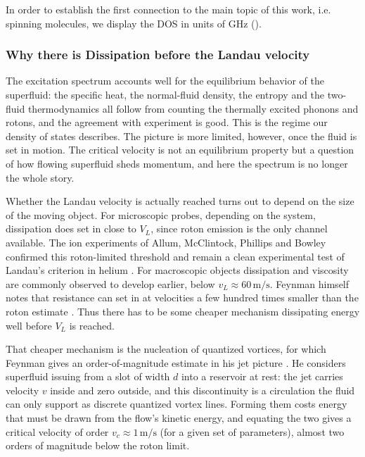 In order to establish the first connection to the main topic of this work, i.e. spinning molecules, we display the DOS in units of GHz ().

\subsubsection{Why there is Dissipation before the Landau velocity}
The excitation spectrum accounts well for the equilibrium behavior of the superfluid: the specific heat, the normal-fluid density, the entropy and the two-fluid thermodynamics all follow from counting the thermally excited phonons and rotons, and the agreement with experiment is good. This is the regime our density of states describes. The picture is more limited, however, once the fluid is set in motion. The critical velocity is not an equilibrium property but a question of how flowing superfluid sheds momentum, and here the spectrum is no longer the whole story.

Whether the Landau velocity is actually reached turns out to depend on the size of the moving object. For microscopic probes, depending on the system, dissipation does set in close to $V_L$, since roton emission is the only channel available. The ion experiments of Allum, McClintock, Phillips and Bowley confirmed this roton-limited threshold and remain a clean experimental test of Landau's criterion in helium \cite{allumBreakdownSuperfluidityLiquid1977}. For macroscopic objects dissipation and viscosity are commonly observed to develop earlier, below $v_L \approx 60\,\mathrm{m/s}$.\cite{mullerCriticalVelocityVortex2022} Feynman himself notes that resistance can set in at velocities a few hundred times smaller than the roton estimate \cite{feynmanChapterIIApplication1955}. Thus there has to be some cheaper mechanism dissipating energy well before $V_L$ is reached.

That cheaper mechanism is the nucleation of quantized vortices, for which Feynman gives an order-of-magnitude estimate in his jet picture \cite{feynmanChapterIIApplication1955}. He considers superfluid issuing from a slot of width $d$ into a reservoir at rest: the jet carries velocity $v$ inside and zero outside, and this discontinuity is a circulation the fluid can only support as discrete quantized vortex lines. Forming them costs energy that must be drawn from the flow's kinetic energy, and equating the two gives a critical velocity of order $v_c \approx 1\,\mathrm{m/s}$  (for a given set of parameters), almost two orders of magnitude below the roton limit.

